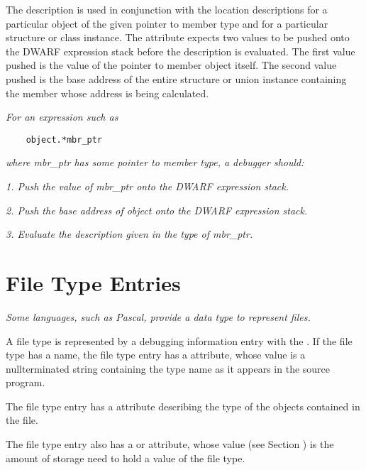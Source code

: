 The  description is used in conjunction
with the location descriptions for a particular object of the
given pointer to member type and for a particular structure or
class instance. The  attribute expects two
values to be pushed onto the DWARF expression stack before
the  description is evaluated. The first
value pushed is the value of the pointer to member object
itself. The second value pushed is the base address of the
entire structure or union instance containing the member
whose address is being calculated.

\textit{For an expression such as}

\begin{lstlisting}
    object.*mbr_ptr
\end{lstlisting}
\textit{where mbr\_ptr has some pointer to member type, a debugger should:}

\textit{1. Push the value of mbr\_ptr onto the DWARF expression stack.}

\textit{2. Push the base address of object onto the DWARF expression stack.}

\textit{3. Evaluate the  description 
given in the type of mbr\_ptr.}

\section{File Type Entries}
\label{chap:filetypeentries}

\textit{Some languages, such as Pascal, provide a data type to represent 
files.}

A file type is represented by a debugging information entry
with the 
. 
If the file type has a name,
the file type entry has a  attribute, whose value
is a null\dash terminated string containing the type name as it
appears in the source program.

The file type entry has a  attribute describing
the type of the objects contained in the file.

The file type entry also has a  or
 attribute, whose value 
(see Section )
is the amount of storage need to hold a value of the file type.

